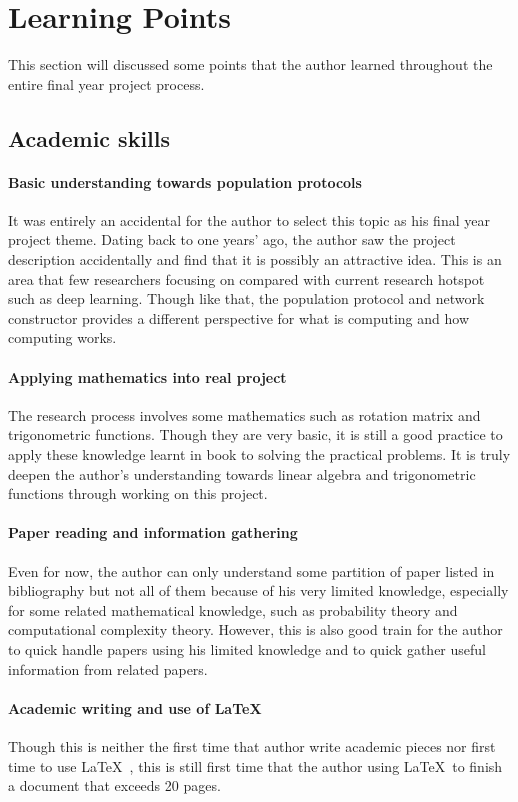 \section{Learning Points}
This section will discussed some points that the author learned throughout the entire final year project process.
\subsection{Academic skills}
\paragraph{Basic understanding towards population protocols}
It was entirely an accidental for the author to select this topic as his final year project theme.
Dating back to one years' ago, the author saw the project description accidentally and find that it is possibly an attractive idea.
This is an area that few researchers focusing on compared with current research hotspot such as deep learning.
Though like that, the population protocol and network constructor provides a different perspective for what is computing and how computing works.

\paragraph{Applying mathematics into real project}
The research process involves some mathematics such as rotation matrix and trigonometric functions.
Though they are very basic, it is still a good practice to apply these knowledge learnt in book to solving the practical problems. It is truly
deepen the author's understanding towards linear algebra and trigonometric functions through working on this project.

\paragraph{Paper reading and information gathering}
Even for now, the author can only understand some partition of paper listed in bibliography but not all of them
because of his very limited knowledge, especially for some related mathematical knowledge, such as probability theory and
computational complexity theory.
However, this is also good train for the author to quick handle papers using his limited knowledge and to quick
gather useful information from related papers.

\paragraph{Academic writing and use of \LaTeX\ }
Though this is neither the first time that author write academic pieces nor first time
to use \LaTeX\ , this is still first time that the author using \LaTeX\ to finish a document that exceeds 20 pages.

